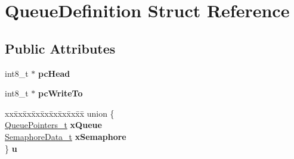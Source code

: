 \hypertarget{struct_queue_definition}{}\section{Queue\+Definition Struct Reference}
\label{struct_queue_definition}
\subsection*{Public Attributes}
\begin{DoxyCompactItemize}
\item 
\mbox{\label{struct_queue_definition_a487dc7e43b380c58212cba72bc33e0ed}} 
int8\+\_\+t $\ast$ {\bfseries pc\+Head}
\item 
\mbox{\label{struct_queue_definition_abdf13cc013c8488848cee3fce4f0fed3}} 
int8\+\_\+t $\ast$ {\bfseries pc\+Write\+To}
\item 
\mbox{\label{struct_queue_definition_a6fa5430c7bbe1795b887e07b526d9f3b}} 
\begin{tabbing}
xx\=xx\=xx\=xx\=xx\=xx\=xx\=xx\=xx\=\kill
union \{\\
\>\mbox{\hyperlink{struct_queue_pointers}{QueuePointers\_t}} {\bfseries xQueue}\\
\>\mbox{\hyperlink{struct_semaphore_data}{SemaphoreData\_t}} {\bfseries xSemaphore}\\
\} {\bfseries u}\\


\end{tabbing}
\end{DoxyCompactItemize}
